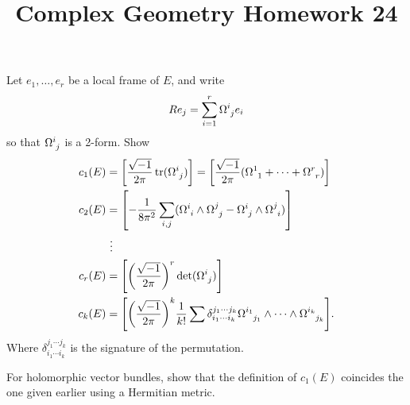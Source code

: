 \documentclass[12pt]{article}
\title{Complex Geometry Homework 24}
\author{}
\date{}
\begin{document}
\maketitle
\begin{problem}
  Let \(e_1,\ldots,e_r\) be a local frame of \(E\), and write \[
    Re_j=\sum_{i=1}^{r}\Omega\indices{^i_j}e_i
  \] so that \(\Omega\indices{^i_j}\) is a 2-form. Show 
  \begin{align*}
    c_1(E)&=\left[\frac{\sqrt{-1}}{2\pi}\op{tr}(\Omega\indices{^i_j})\right]
    =\left[\frac{\sqrt{-1}}{2\pi}(\Omega\indices{^1_1}+\cdots+\Omega\indices{^r
    _r})\right] \\
    c_2(E)&=\left[-\frac{1}{8\pi^2}\sum_{i,j}(\Omega\indices{^i_i}\wedge\Omega
    \indices{^j_j}-\Omega\indices{^i_j}\wedge\Omega\indices{^j_i})\right] \\
    &\ \vdots \\
    c_r(E)&=\left[\left(\frac{\sqrt{-1}}{2\pi}\right)^r\det(\Omega\indices{^i_j}
    )\right] \\
    c_k(E)&=\left[\left(\frac{\sqrt{-1}}{2\pi}\right)^k \frac{1}{k!}\sum
    \delta_{i_1\cdots i_k}^{j_1\cdots j_k}\Omega\indices{^{i_1}_{j_1}}\wedge 
    \cdots\wedge\Omega\indices{^{i_k}_{j_k}}\right]
  .\end{align*}
  Where \(\delta_{i_1\cdots i_k}^{j_1\cdots j_k}\) is the signature of the 
  permutation.
\end{problem}
\begin{problem}
  For holomorphic vector bundles, show that the definition of \(c_1(E)\)
  coincides the one given earlier using a Hermitian metric.
\end{problem}
\end{document}
